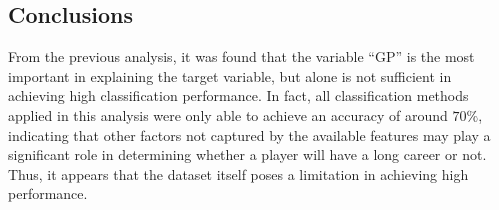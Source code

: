 \subsection{Conclusions}

From the previous analysis, it was found that the variable ``GP'' is the most important in explaining the target variable, but alone is not sufficient in achieving high classification performance. In fact, all classification methods applied in this analysis were only able to achieve an accuracy of around $70\%$, indicating that other factors not captured by the available features may play a significant role in determining whether a player will have a long career or not. Thus, it appears that the dataset itself poses a limitation in achieving high performance.